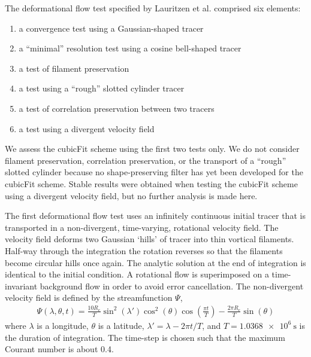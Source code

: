 The deformational flow test specified by Lauritzen et al. \citep{lauritzen2012} comprised six elements:
\begin{enumerate}
\item a convergence test using a Gaussian-shaped tracer
\item a ``minimal'' resolution test using a cosine bell-shaped tracer
\item a test of filament preservation
\item a test using a ``rough'' slotted cylinder tracer
\item a test of correlation preservation between two tracers
\item a test using a divergent velocity field
\end{enumerate}
We assess the cubicFit scheme using the first two tests only.  We do not consider filament preservation, correlation preservation, or the transport of a ``rough'' slotted cylinder because no shape-preserving filter has yet been developed for the cubicFit scheme.  Stable results were obtained when testing the cubicFit scheme using a divergent velocity field, but no further analysis is made here.

The first deformational flow test uses an infinitely continuous initial tracer that is transported in a non-divergent, time-varying, rotational velocity field.
The velocity field deforms two Gaussian `hills' of tracer into thin vortical filaments.  Half-way through the integration the rotation reverses so that the filaments become circular hills once again.  The analytic solution at the end of integration is identical to the initial condition.
A rotational flow is superimposed on a time-invariant background flow in order to avoid error cancellation.
The non-divergent velocity field is defined by the streamfunction $\Psi$,
\begin{align}
	\Psi(\lambda, \theta, t) = \frac{10 R_e}{T} \sin^2 \left(\lambda'\right) \cos^2 \left(\theta\right) \cos \left( \frac{\pi t}{T} \right) - \frac{2 \pi R_e}{T} \sin\left(\theta\right)
\end{align}
where $\lambda$ is a longitude, $\theta$ is a latitude, $\lambda' = \lambda - 2 \pi t / T$, and $T = \SI{1.0368e6}{\second}$ is the duration of integration.  The time-step is chosen such that the maximum Courant number is about 0.4.

